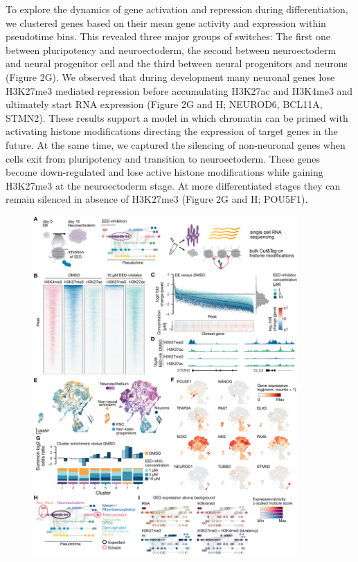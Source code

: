 To explore the dynamics of gene activation and repression during differentiation, we clustered genes based on their mean gene activity and expression within pseudotime bins. This revealed three major groups of switches: The first one between pluripotency and neuroectoderm, the second between neuroectoderm and neural progenitor cell and the third between neural progenitors and neurons (Figure 2G). We observed that during development many neuronal genes lose H3K27me3 mediated repression before accumulating H3K27ac and H3K4me3 and ultimately start RNA expression (Figure 2G and H; NEUROD6, BCL11A, STMN2). These results support a model in which chromatin can be primed with activating histone modifications directing the expression of target genes in the future. At the same time, we captured the silencing of non-neuronal genes when cells exit from pluripotency and transition to neuroectoderm. These genes become down-regulated and lose active histone modifications while gaining H3K27me3 at the neuroectoderm stage. At more differentiated stages they can remain silenced in absence of H3K27me3 (Figure 2G and H; POU5F1).

\begin{figure}[t!]
    \centering
	\includegraphics[width=0.9\textwidth]{figures/cnt/Figure_3}
    \label{fig:cnt2}
\end{figure}

